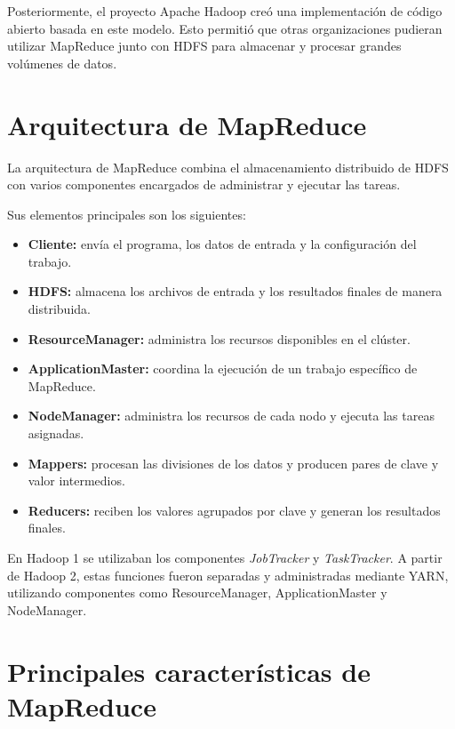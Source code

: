 Posteriormente, el proyecto Apache Hadoop creó una implementación de código
abierto basada en este modelo. Esto permitió que otras organizaciones pudieran
utilizar MapReduce junto con HDFS para almacenar y procesar grandes volúmenes
de datos.

\section{Arquitectura de MapReduce}

La arquitectura de MapReduce combina el almacenamiento distribuido de HDFS con
varios componentes encargados de administrar y ejecutar las tareas.

Sus elementos principales son los siguientes:

\begin{itemize}
    \item \textbf{Cliente:} envía el programa, los datos de entrada y la
    configuración del trabajo.

    \item \textbf{HDFS:} almacena los archivos de entrada y los resultados
    finales de manera distribuida.

    \item \textbf{ResourceManager:} administra los recursos disponibles en el
    clúster.

    \item \textbf{ApplicationMaster:} coordina la ejecución de un trabajo
    específico de MapReduce.

    \item \textbf{NodeManager:} administra los recursos de cada nodo y ejecuta
    las tareas asignadas.

    \item \textbf{Mappers:} procesan las divisiones de los datos y producen
    pares de clave y valor intermedios.

    \item \textbf{Reducers:} reciben los valores agrupados por clave y generan
    los resultados finales.
\end{itemize}

En Hadoop 1 se utilizaban los componentes \textit{JobTracker} y
\textit{TaskTracker}. A partir de Hadoop 2, estas funciones fueron separadas y
administradas mediante YARN, utilizando componentes como ResourceManager,
ApplicationMaster y NodeManager.

\section{Principales características de MapReduce}

